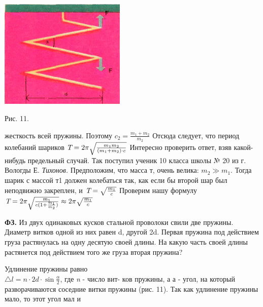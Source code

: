 \documentclass{article}
\begin{document}
	\newpage
	\begin{multicols}{2}
		\hspace{-15px}\includegraphics[width=0.45\textwidth]{Картинки/Рисунок 11.png}
		\vspace{-1cm}
		\par
		\hspace{-17px} Рис. 11.
		\par
		\vspace{-1cm}
		\hspace{-21px}
		жесткость всей пружины. Поэтому \Large{$c_{2} = \frac{m_{1} + m_{2}}{m_{2}}$} Отсюда следует, что период колебаний шариков
		\Large{$\emph{T} = 2\pi \sqrt{\frac{m_{1}m_{2}}{(m_{1} + m_{2}) \cdot c}}$}
		Интересно проверить ответ, взяв какой-нибудь предельный случай. Так поступил ученик 10 класса школы № 20 из г. Вологды Е. \emph{Тихонов.} Предположим, что масса т, очень велика: \Large{$m_{2} \gg m_{1}$}. Тогда шарик с массой т1 должен колебаться так, как если бы второй шар был неподвижно закреплен, и
		\Large{$\emph{T} =  \sqrt{\frac{m_{1}}{c}}$}
		Проверим нашу формулу\\
		\Large{$\emph{T} = 2\pi \sqrt{\frac{m_{1}}{c(1 + \frac{m_{1}}{m_{2}})}} \approx 2\pi \sqrt{\frac{m_{1}}{c}}$}
		\vspace{-1cm}
		\par
		{\small\textbf{ФЗ.} Из двух одинаковых кусков стальной проволоки свили две пружины. Диаметр витков одной из них равен d, другой 2d. Первая пружина под действием груза растянулась на одну десятую своей длины. На какую часть своей длины растянется под действием того же груза вторая пружина?}
		\vspace{-1cm}
		\par
		Удлинение пружины равно\\ $\triangle l = n \cdot 2d \cdot \sin{\frac{\alpha}{2}}$, где \emph{n} - число вит-
		ков пружины, а а - угол, на который разворачиваются соседние витки пружины (рис. 11). Так как удлинение пружины мало, то этот угол мал и\\

\end{multicols}
\end{document}
